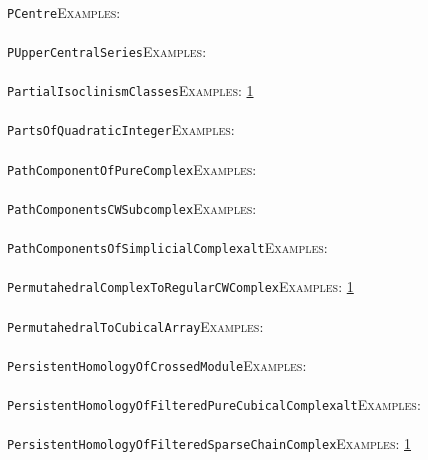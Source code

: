 \documentclass[a4paper,11pt]{report}
\begin{document}
{{ \\
 \texttt{PCentre}{\nobreakspace}{\nobreakspace}{\nobreakspace}{\nobreakspace}\textsc{Examples:} \\
 \\
 \texttt{PUpperCentralSeries}{\nobreakspace}{\nobreakspace}{\nobreakspace}{\nobreakspace}\textsc{Examples:} \\
 \\
 \texttt{PartialIsoclinismClasses}{\nobreakspace}{\nobreakspace}{\nobreakspace}{\nobreakspace}\textsc{Examples:} \href{../www/SideLinks/About/aboutBogomolov.html} {1}{\nobreakspace} \\
 \\
 \texttt{PartsOfQuadraticInteger}{\nobreakspace}{\nobreakspace}{\nobreakspace}{\nobreakspace}\textsc{Examples:} \\
 \\
 \texttt{PathComponentOfPureComplex}{\nobreakspace}{\nobreakspace}{\nobreakspace}{\nobreakspace}\textsc{Examples:} \\
 \\
 \texttt{PathComponentsCWSubcomplex}{\nobreakspace}{\nobreakspace}{\nobreakspace}{\nobreakspace}\textsc{Examples:} \\
 \\
 \texttt{PathComponentsOfSimplicialComplex{\textunderscore}alt}{\nobreakspace}{\nobreakspace}{\nobreakspace}{\nobreakspace}\textsc{Examples:} \\
 \\
 \texttt{PermutahedralComplexToRegularCWComplex}{\nobreakspace}{\nobreakspace}{\nobreakspace}{\nobreakspace}\textsc{Examples:} \href{../www/SideLinks/About/aboutPeripheral.html} {1}{\nobreakspace} \\
 \\
 \texttt{PermutahedralToCubicalArray}{\nobreakspace}{\nobreakspace}{\nobreakspace}{\nobreakspace}\textsc{Examples:} \\
 \\
 \texttt{PersistentHomologyOfCrossedModule}{\nobreakspace}{\nobreakspace}{\nobreakspace}{\nobreakspace}\textsc{Examples:} \\
 \\
 \texttt{PersistentHomologyOfFilteredPureCubicalComplex{\textunderscore}alt}{\nobreakspace}{\nobreakspace}{\nobreakspace}{\nobreakspace}\textsc{Examples:} \\
 \\
 \texttt{PersistentHomologyOfFilteredSparseChainComplex}{\nobreakspace}{\nobreakspace}{\nobreakspace}{\nobreakspace}\textsc{Examples:} \href{../www/SideLinks/About/aboutPersistent.html} {1}{\nobreakspace} \\
}}
\end{document}
